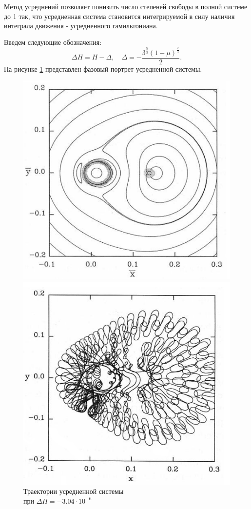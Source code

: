 Метод усреднений позволяет понизить число степеней свободы в полной системе до 1 так, что усредненная система становится интегрируемой в силу наличия интеграла движения - усредненного гамильтониана. 

Введем следующие обозначения:
$$
\Delta H = H - \Delta,\quad
\Delta = - \frac{3^\frac53 (1-\mu)^\frac23}{2}.
$$
На рисунке \ref{aver_fig} представлен фазовый портрет усредненной системы.
\begin{figure}[!htb]
    \centering
    \begin{minipage}{0.5\textwidth}
        \centering
        \includegraphics[scale=0.2]{img/p1.png}
        \caption{Траектории усредненной системы \\ при $\Delta H = -3.04 \cdot 10^{-6}$}
        \label{aver_fig}
    \end{minipage}%
    \begin{minipage}{0.5\textwidth}
        \centering
        \includegraphics[scale=0.2]{img/p2.png}

\end{minipage}
\end{figure}
